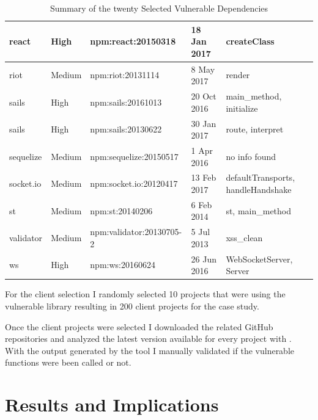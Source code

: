 \begin{table}[ht]
{\begin{tabular}{|l|l|l|l|l|}
react & High & npm:react:20150318 & 18 Jan 2017 & createClass \\ \hline
riot & Medium & npm:riot:20131114 & 8 May 2017 & render \\ \hline
sails & High & npm:sails:20161013 & 20 Oct 2016 & main\_method, initialize \\ \hline
sails & High & npm:sails:20130622 & 30 Jan 2017 & route, interpret \\ \hline
sequelize & Medium & npm:sequelize:20150517 & 1 Apr 2016 & no info found \\ \hline
socket.io & Medium & npm:socket.io:20120417 & 13 Feb 2017 & defaultTransports, handleHandshake \\ \hline
st & Medium & npm:st:20140206 & 6 Feb 2014 & st, main\_method \\ \hline
validator & Medium & npm:validator:20130705-2 & 5 Jul 2013 & xss\_clean \\ \hline
ws & High & npm:ws:20160624 & 26 Jun 2016 & WebSocketServer, Server \\ \hline
\end{tabular}}
\caption{Summary of the twenty Selected Vulnerable Dependencies}
\label{tab:impactVulnerabilities}
\end{table}

For the client selection I randomly selected 10 projects that were using the vulnerable library resulting in 200 client projects for the case study. 

Once the client projects were selected I downloaded the related GitHub repositories and analyzed the latest version available for every project with \tool[]. With the output generated by the tool I manually validated if the vulnerable functions were been called or not.

\section{Results and Implications}

\begin{table}[ht]
\centering
{}
\caption{Summary of the analysis of the output generated by \tool[]}
\label{tab:impactResults}
\end{table}

